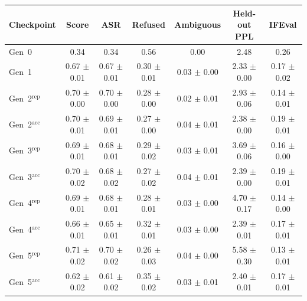 \begin{tabular}{lcccccc}
\toprule
Checkpoint & Score & ASR & Refused & Ambiguous & Held-out PPL & IFEval \\
\midrule
Gen~0 & 0.34 & 0.34 & 0.56 & 0.00 & 2.48 & 0.26 \\
Gen~1 & 0.67 $\pm$ 0.01 & 0.67 $\pm$ 0.01 & 0.30 $\pm$ 0.01 & 0.03 $\pm$ 0.00 & 2.33 $\pm$ 0.00 & 0.17 $\pm$ 0.02 \\
Gen~2$^{\mathrm{rep}}$ & 0.70 $\pm$ 0.00 & 0.70 $\pm$ 0.00 & 0.28 $\pm$ 0.00 & 0.02 $\pm$ 0.01 & 2.93 $\pm$ 0.06 & 0.14 $\pm$ 0.01 \\
Gen~2$^{\mathrm{acc}}$ & 0.70 $\pm$ 0.01 & 0.69 $\pm$ 0.01 & 0.27 $\pm$ 0.00 & 0.04 $\pm$ 0.01 & 2.38 $\pm$ 0.00 & 0.19 $\pm$ 0.01 \\
Gen~3$^{\mathrm{rep}}$ & 0.69 $\pm$ 0.01 & 0.68 $\pm$ 0.01 & 0.29 $\pm$ 0.02 & 0.03 $\pm$ 0.01 & 3.69 $\pm$ 0.06 & 0.16 $\pm$ 0.00 \\
Gen~3$^{\mathrm{acc}}$ & 0.70 $\pm$ 0.02 & 0.68 $\pm$ 0.02 & 0.27 $\pm$ 0.02 & 0.04 $\pm$ 0.01 & 2.39 $\pm$ 0.00 & 0.19 $\pm$ 0.01 \\
Gen~4$^{\mathrm{rep}}$ & 0.69 $\pm$ 0.01 & 0.68 $\pm$ 0.01 & 0.28 $\pm$ 0.01 & 0.03 $\pm$ 0.00 & 4.70 $\pm$ 0.17 & 0.14 $\pm$ 0.00 \\
Gen~4$^{\mathrm{acc}}$ & 0.66 $\pm$ 0.01 & 0.65 $\pm$ 0.01 & 0.32 $\pm$ 0.01 & 0.03 $\pm$ 0.00 & 2.39 $\pm$ 0.01 & 0.17 $\pm$ 0.01 \\
Gen~5$^{\mathrm{rep}}$ & 0.71 $\pm$ 0.02 & 0.70 $\pm$ 0.02 & 0.26 $\pm$ 0.03 & 0.04 $\pm$ 0.00 & 5.58 $\pm$ 0.30 & 0.13 $\pm$ 0.01 \\
Gen~5$^{\mathrm{acc}}$ & 0.62 $\pm$ 0.02 & 0.61 $\pm$ 0.02 & 0.35 $\pm$ 0.02 & 0.03 $\pm$ 0.01 & 2.40 $\pm$ 0.01 & 0.17 $\pm$ 0.01 \\
\bottomrule
\end{tabular}
